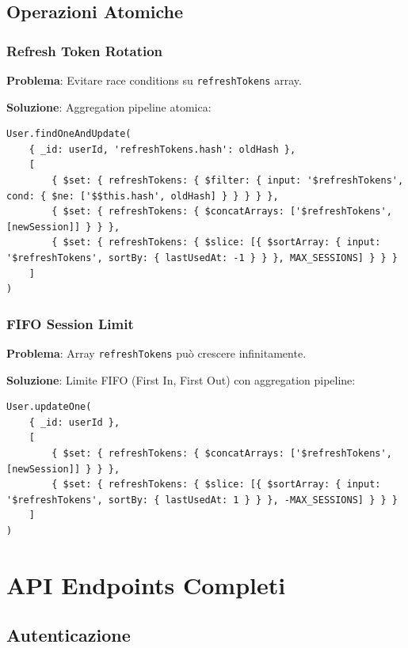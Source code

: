 \documentclass[11pt,a4paper]{article}
\begin{document}
\subsection{Operazioni Atomiche}

\subsubsection{Refresh Token Rotation}

\textbf{Problema}: Evitare race conditions su \texttt{refreshTokens} array.

\textbf{Soluzione}: Aggregation pipeline atomica:

\begin{lstlisting}
User.findOneAndUpdate(
    { _id: userId, 'refreshTokens.hash': oldHash },
    [
        { $set: { refreshTokens: { $filter: { input: '$refreshTokens', cond: { $ne: ['$$this.hash', oldHash] } } } } },
        { $set: { refreshTokens: { $concatArrays: ['$refreshTokens', [newSession]] } } },
        { $set: { refreshTokens: { $slice: [{ $sortArray: { input: '$refreshTokens', sortBy: { lastUsedAt: -1 } } }, MAX_SESSIONS] } } }
    ]
)
\end{lstlisting}

\subsubsection{FIFO Session Limit}

\textbf{Problema}: Array \texttt{refreshTokens} può crescere infinitamente.

\textbf{Soluzione}: Limite FIFO (First In, First Out) con aggregation pipeline:

\begin{lstlisting}
User.updateOne(
    { _id: userId },
    [
        { $set: { refreshTokens: { $concatArrays: ['$refreshTokens', [newSession]] } } },
        { $set: { refreshTokens: { $slice: [{ $sortArray: { input: '$refreshTokens', sortBy: { lastUsedAt: 1 } } }, -MAX_SESSIONS] } } }
    ]
)
\end{lstlisting}

\section{API Endpoints Completi}

\subsection{Autenticazione}
\end{document}
